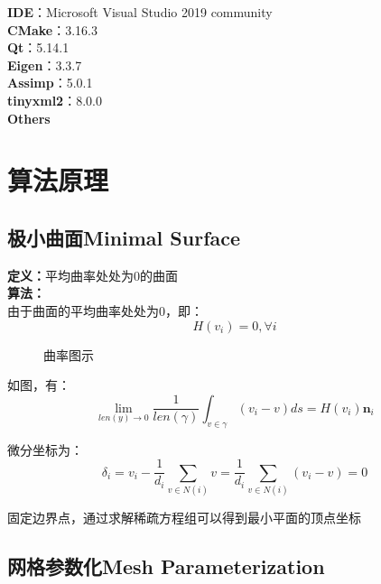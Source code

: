\documentclass[14pt]{scrartcl} %
\begin{document}
	\textbf{IDE}：Microsoft Visual Studio 2019 community\\
	\textbf{CMake}：3.16.3\\
	\textbf{Qt}：5.14.1\\
	\textbf{Eigen}：3.3.7\\
	\textbf{Assimp}：5.0.1\\
	\textbf{tinyxml2}：8.0.0\\
	\textbf{Others}
	
	
	\pagebreak
	\section{算法原理}
	
	\subsection{极小曲面Minimal Surface}
	
	\textbf{定义：}平均曲率处处为0的曲面\\
	\textbf{算法：}\\
	由于曲面的平均曲率处处为0，即：
	\begin{equation}
		H(v_i)=0,\forall i
	\end{equation}
	\begin{figure}[h] %
		\centering
		\caption{曲率图示}
	\end{figure}
	
	如图，有：
	\begin{equation}
		\lim\limits_{len(y)\rightarrow 0}\frac{1}{len(\gamma)}\int_{v\in \gamma}(v_i-v)ds=H(v_i)\boldsymbol{n}_i
	\end{equation}
	
	微分坐标为：
	\begin{equation}
		\delta_i=v_i-\frac{1}{d_i}\sum\limits_{v\in N(i)} v =\frac{1}{d_i}\sum\limits_{v\in N(i)} (v_i-v)=0
	\end{equation}
	
	固定边界点，通过求解稀疏方程组可以得到最小平面的顶点坐标
	\pagebreak
	
	\subsection{网格参数化Mesh Parameterization}
	
\end{document}
